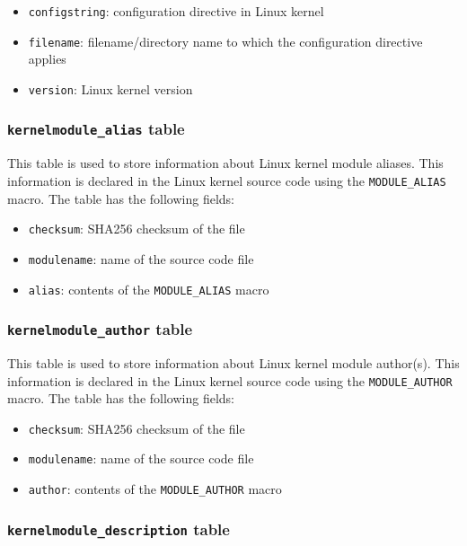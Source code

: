 \documentclass[10pt,a4paper]{article}
\begin{document}
\begin{itemize}
\item \texttt{configstring}: configuration directive in Linux kernel
\item \texttt{filename}: filename/directory name to which the configuration
directive applies
\item \texttt{version}: Linux kernel version
\end{itemize}

\subsubsection{\texttt{kernelmodule\_alias} table}

This table is used to store information about Linux kernel module aliases. This
information is declared in the Linux kernel source code using the
\texttt{MODULE\_ALIAS} macro. The table has the following fields:

\begin{itemize}
\item \texttt{checksum}: SHA256 checksum of the file
\item \texttt{modulename}: name of the source code file
\item \texttt{alias}: contents of the \texttt{MODULE\_ALIAS} macro
\end{itemize}

\subsubsection{\texttt{kernelmodule\_author} table}

This table is used to store information about Linux kernel module author(s).
This information is declared in the Linux kernel source code using the
\texttt{MODULE\_AUTHOR} macro. The table has the following fields:

\begin{itemize}
\item \texttt{checksum}: SHA256 checksum of the file
\item \texttt{modulename}: name of the source code file
\item \texttt{author}: contents of the \texttt{MODULE\_AUTHOR} macro
\end{itemize}

\subsubsection{\texttt{kernelmodule\_description} table}
\end{document}
